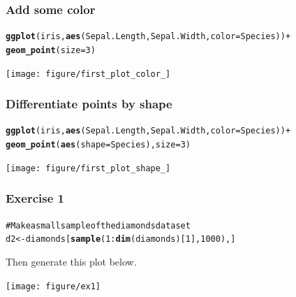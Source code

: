 \documentclass{beamer}\usepackage{graphicx, color}
\makeatletter
\newcommand{\hlfunctioncall}[1]{\textcolor[rgb]{0.501960784313725,0,0.329411764705882}{\textbf{#1}}}%
\newcommand{\hlcomment}[1]{\textcolor[rgb]{0.180392156862745,0.6,0.341176470588235}{#1}}%
\newenvironment{kframe}{%
 \def\at@end@of@kframe{}%
 \ifinner\ifhmode%
  \def\at@end@of@kframe{\end{minipage}}%
  \begin{minipage}{\columnwidth}%
 \fi\fi%
 \def\FrameCommand##1{\hskip\@totalleftmargin \hskip-\fboxsep
 \colorbox{shadecolor}{##1}\hskip-\fboxsep
     \hskip-\linewidth \hskip-\@totalleftmargin \hskip\columnwidth}%
 \MakeFramed {\advance\hsize-\width
   \@totalleftmargin\z@ \linewidth\hsize
   \@setminipage}}%
 {\par\unskip\endMakeFramed%
 \at@end@of@kframe}
\newenvironment{knitrout}{}{} %
\makeatother
\begin{document}
\begin{frame}[fragile]
\frametitle{Add some color}
\begin{knitrout}\footnotesize
{}\color{fgcolor}\begin{kframe}
\begin{alltt}
\hlfunctioncall{ggplot}(iris, \hlfunctioncall{aes}(Sepal.Length, Sepal.Width, color = Species)) +
\hlfunctioncall{geom_point}(size = 3)
\end{alltt}
\end{kframe}
\texttt{[image: figure/first\_plot\_color\_]} 

\end{knitrout}

\end{frame}

\begin{frame}[fragile]
\frametitle{Differentiate points by shape}
\begin{knitrout}\footnotesize
{}\color{fgcolor}\begin{kframe}
\begin{alltt}
\hlfunctioncall{ggplot}(iris, \hlfunctioncall{aes}(Sepal.Length, Sepal.Width, color = Species)) +
\hlfunctioncall{geom_point}(\hlfunctioncall{aes}(shape = Species), size = 3)
\end{alltt}
\end{kframe}
\texttt{[image: figure/first\_plot\_shape\_]} 

\end{knitrout}

\end{frame}

\begin{frame}[fragile]
\frametitle{Exercise 1}
\begin{knitrout}\footnotesize
{}\color{fgcolor}\begin{kframe}
\begin{alltt}
\hlcomment{# Make a small sample of the diamonds dataset}
d2 <- diamonds[\hlfunctioncall{sample}(1:\hlfunctioncall{dim}(diamonds)[1], 1000), ]
\end{alltt}
\end{kframe}
\end{knitrout}

Then generate this plot below.

\begin{knitrout}\footnotesize
{}\color{fgcolor}
\texttt{[image: figure/ex1]} 

\end{knitrout}

\end{frame}
\end{document}
